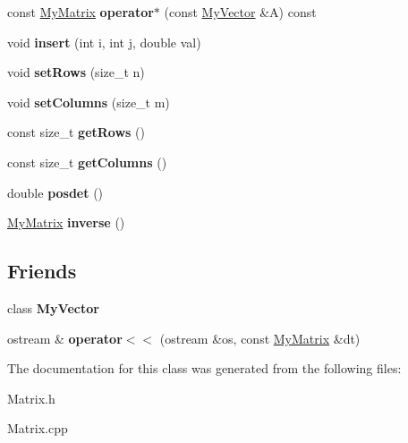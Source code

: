 \begin{DoxyCompactItemize}
\item 
\hypertarget{class_my_matrix_ac0a64279e3628614611c1a4492043fc1}{}const \hyperlink{class_my_matrix}{My\+Matrix} {\bfseries operator$\ast$} (const \hyperlink{class_my_vector}{My\+Vector} \&A) const \label{class_my_matrix_ac0a64279e3628614611c1a4492043fc1}

\item 
\hypertarget{class_my_matrix_ae94e50799437d1a2e10e158a49a123c3}{}void {\bfseries insert} (int i, int j, double val)\label{class_my_matrix_ae94e50799437d1a2e10e158a49a123c3}

\item 
\hypertarget{class_my_matrix_ace37aa07b4b090a6246989a1d3c3cb39}{}void {\bfseries set\+Rows} (size\+\_\+t n)\label{class_my_matrix_ace37aa07b4b090a6246989a1d3c3cb39}

\item 
\hypertarget{class_my_matrix_a7bf0d26f3c8fc31a23bd4ec9daa096cb}{}void {\bfseries set\+Columns} (size\+\_\+t m)\label{class_my_matrix_a7bf0d26f3c8fc31a23bd4ec9daa096cb}

\item 
\hypertarget{class_my_matrix_aa1ea3a7d4a4a47eedc992990bf6c5a52}{}const size\+\_\+t {\bfseries get\+Rows} ()\label{class_my_matrix_aa1ea3a7d4a4a47eedc992990bf6c5a52}

\item 
\hypertarget{class_my_matrix_ab22a3b6f5b870c8b94630633e1c5deb4}{}const size\+\_\+t {\bfseries get\+Columns} ()\label{class_my_matrix_ab22a3b6f5b870c8b94630633e1c5deb4}

\item 
\hypertarget{class_my_matrix_a5aac388302519656ede2eb251de2c112}{}double {\bfseries posdet} ()\label{class_my_matrix_a5aac388302519656ede2eb251de2c112}

\item 
\hypertarget{class_my_matrix_a4c61f1c336a7d4626fbcb5c8fe6e822e}{}\hyperlink{class_my_matrix}{My\+Matrix} {\bfseries inverse} ()\label{class_my_matrix_a4c61f1c336a7d4626fbcb5c8fe6e822e}

\end{DoxyCompactItemize}
\subsection*{Friends}
\begin{DoxyCompactItemize}
\item 
\hypertarget{class_my_matrix_aabcccde25bfd15336f875970b46beecf}{}class {\bfseries My\+Vector}\label{class_my_matrix_aabcccde25bfd15336f875970b46beecf}

\item 
\hypertarget{class_my_matrix_a0616ecef5f5979c394418ef848191bfe}{}ostream \& {\bfseries operator$<$$<$} (ostream \&os, const \hyperlink{class_my_matrix}{My\+Matrix} \&dt)\label{class_my_matrix_a0616ecef5f5979c394418ef848191bfe}

\end{DoxyCompactItemize}


The documentation for this class was generated from the following files\+:\begin{DoxyCompactItemize}
\item 
Matrix.\+h\item 
Matrix.\+cpp\end{DoxyCompactItemize}
